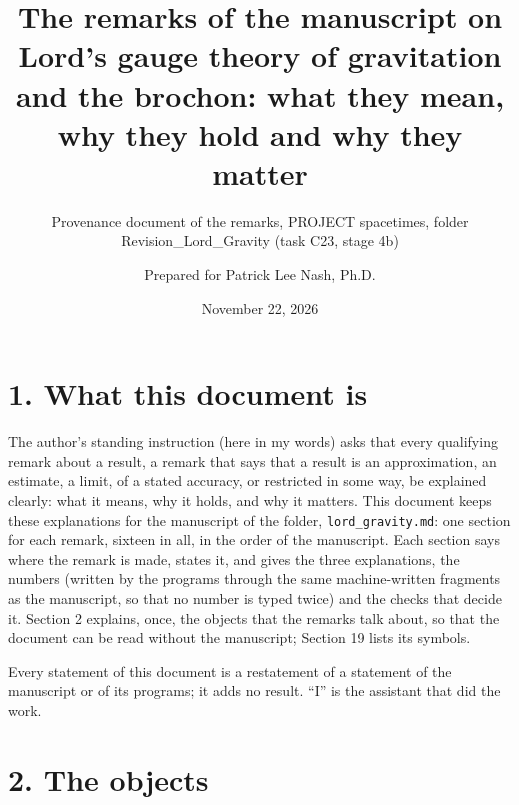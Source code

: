 \documentclass[
  10pt,
]{article}
\title{The remarks of the manuscript on Lord's gauge theory of
gravitation and the brochon: what they mean, why they hold and why they
matter}
\subtitle{Provenance document of the remarks, PROJECT spacetimes, folder
Revision\_Lord\_Gravity (task C23, stage 4b)}
\author{Prepared for Patrick Lee Nash, Ph.D.}
\date{November 22, 2026}
\begin{document}
\maketitle

\hypertarget{what-this-document-is}{%
\section{1. What this document is}\label{what-this-document-is}}

The author's standing instruction (here in my words) asks that every
qualifying remark about a result, a remark that says that a result is an
approximation, an estimate, a limit, of a stated accuracy, or restricted
in some way, be explained clearly: what it means, why it holds, and why
it matters. This document keeps these explanations for the manuscript of
the folder, \texttt{lord\_gravity.md}: one section for each remark,
sixteen in all, in the order of the manuscript. Each section says where
the remark is made, states it, and gives the three explanations, the
numbers (written by the programs through the same machine-written
fragments as the manuscript, so that no number is typed twice) and the
checks that decide it. Section 2 explains, once, the objects that the
remarks talk about, so that the document can be read without the
manuscript; Section 19 lists its symbols.

Every statement of this document is a restatement of a statement of the
manuscript or of its programs; it adds no result. ``I'' is the assistant
that did the work.

\hypertarget{the-objects}{%
\section{2. The objects}\label{the-objects}}
\end{document}
